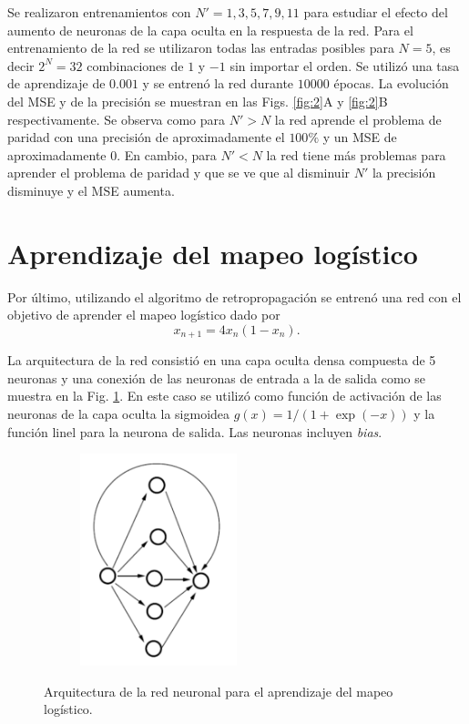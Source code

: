 \documentclass[11pt,twocolumn,twoside]{opticajnl}
\begin{document}
Se realizaron entrenamientos con $N' = 1,3,5,7,9,11$ para estudiar el efecto del aumento de neuronas de la capa oculta en la respuesta de la red. Para el entrenamiento de la red se utilizaron todas las entradas posibles para $N=5$, es decir $2^{N} = 32$ combinaciones de $1$ y $-1$ sin importar el orden. Se utilizó una tasa de aprendizaje de $0.001$ y se entrenó la red durante $10000$ épocas. La evolución del MSE y de la precisión se muestran en las Figs. \ref{fig:2}A y \ref{fig:2}B respectivamente. Se observa como para $N'>N$ la red aprende el problema de paridad con una precisión de aproximadamente el $100\%$ y un MSE de aproximadamente $0$. En cambio, para $N' < N$ la red tiene más problemas para aprender el problema de paridad y que se ve que al disminuir $N'$ la precisión disminuye y el MSE aumenta.

\section{Aprendizaje del mapeo logístico\label{sec:ej3}}

\vspace{0.3cm}

Por último, utilizando el algoritmo de retropropagación se entrenó una red con el objetivo de aprender el mapeo logístico dado por 
\begin{equation}
    x_{n+1} = 4 x_n (1- x_n).
\end{equation}

La arquitectura de la red consistió en una capa oculta densa compuesta de 5 neuronas y una conexión de las neuronas de entrada a la de salida como se muestra en la Fig. \ref{fig:esq_3}. En este caso se utilizó como función de activación de las neuronas de la capa oculta la sigmoidea $g(x) = 1/(1 + \exp{(-x)})$ y la función linel para la neurona de salida. Las neuronas incluyen \textit{bias}.

\begin{figure}[ht]
    \centering
         \begin{subfigure}[b]{0.75\linewidth}
            \centering
            \includegraphics[width=0.5\textwidth]{Figuras/esquema3.png}
         \end{subfigure}
    \caption{Arquitectura de la red neuronal para el aprendizaje del mapeo logístico.} 
    \label{fig:esq_3}
\end{figure}
\end{document}
